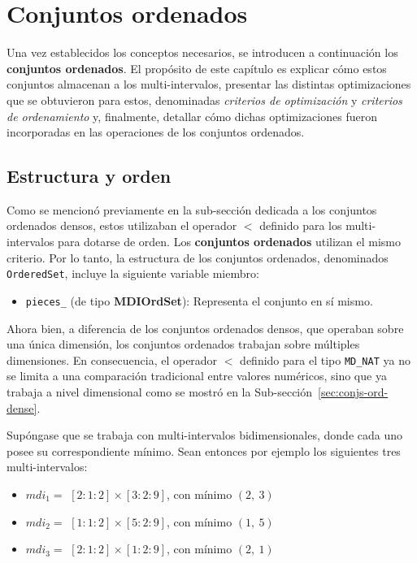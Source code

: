 \chapter{Conjuntos ordenados}

Una vez establecidos los conceptos necesarios, se introducen a continuación los 
\textbf{conjuntos ordenados}. El propósito de este capítulo es explicar cómo estos 
conjuntos almacenan a los multi-intervalos, presentar las distintas optimizaciones que se 
obtuvieron para estos, denominadas \textit{criterios de optimización} y \textit{criterios de ordenamiento} y, finalmente, detallar cómo dichas 
optimizaciones fueron incorporadas en las operaciones de los conjuntos ordenados.


\section{Estructura y orden}

Como se mencionó previamente en la sub-sección dedicada a los conjuntos ordenados densos, estos utilizaban el operador $<$ definido para los multi-intervalos para dotarse de orden. Los \textbf{conjuntos ordenados} utilizan el mismo criterio. Por lo tanto, la estructura de los conjuntos ordenados, denominados \texttt{OrderedSet}, incluye la siguiente variable miembro:

\begin{itemize}
  \item \texttt{pieces\_} (de tipo \textbf{MDIOrdSet}): Representa el conjunto en sí mismo.
\end{itemize}

Ahora bien, a diferencia de los conjuntos ordenados densos, que operaban sobre una única dimensión, los conjuntos ordenados trabajan sobre múltiples dimensiones. En consecuencia, el operador $<$ definido para el tipo \texttt{MD\_NAT} ya no se limita a una comparación tradicional entre valores numéricos, sino que ya trabaja a nivel dimensional como se mostró en la Sub-sección~\ref{sec:conjs-ord-dense}.

Supóngase que se trabaja con multi-intervalos bidimensionales, donde cada uno posee su correspondiente mínimo. Sean entonces por ejemplo los siguientes tres multi-intervalos:

\begin{itemize}
    \item $mdi_1 =$ $[2:1:2]\times[3:2:9]$, con mínimo $(2,\ 3)$
    \item $mdi_2 =$ $[1:1:2]\times[5:2:9]$, con mínimo $(1,\ 5)$
    \item $mdi_3 =$ $[2:1:2]\times[1:2:9]$, con mínimo $(2,\ 1)$
\end{itemize}

